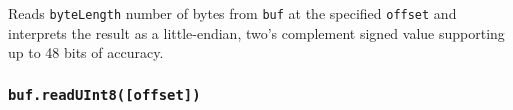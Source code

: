 Reads \texttt{byteLength} number of bytes from \texttt{buf} at the
specified \texttt{offset} and interprets the result as a little-endian,
two's complement signed value supporting up to 48 bits of accuracy.

\begin{Shaded}
\begin{Highlighting}[]
\NormalTok{ \{ }\NormalTok{ \} } \OperatorTok{;}

\OperatorTok{=} \NormalTok{([}\OperatorTok{,} \OperatorTok{,} \OperatorTok{,} \OperatorTok{,} \OperatorTok{,} \NormalTok{])}\OperatorTok{;}

\NormalTok{(}\OperatorTok{,} \NormalTok{)}\NormalTok{(}\NormalTok{))}\OperatorTok{;}
\end{Highlighting}
\end{Shaded}

\begin{Shaded}
\begin{Highlighting}[]
\NormalTok{ \{ }\NormalTok{ \} }\OperatorTok{=} \NormalTok{(}\NormalTok{)}\OperatorTok{;}

\OperatorTok{=} \NormalTok{([}\OperatorTok{,} \OperatorTok{,} \OperatorTok{,} \OperatorTok{,} \OperatorTok{,} \NormalTok{])}\OperatorTok{;}

\NormalTok{(}\OperatorTok{,} \NormalTok{)}\NormalTok{(}\NormalTok{))}\OperatorTok{;}
\end{Highlighting}
\end{Shaded}

\subsubsection{\texorpdfstring{\texttt{buf.readUInt8({[}offset{]})}}{buf.readUInt8({[}offset{]})}}\label{buf.readuint8offset}

